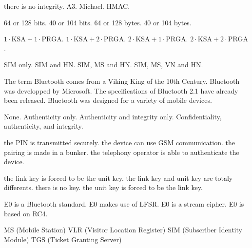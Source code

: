 {there is no integrity.}
{A3.}
{Michael.}
{HMAC.}

{64 or 128 bits.}
{40 or 104 bits.}
{64 or 128 bytes.}
{40 or 104 bytes.}

{$1\cdot\mathrm{KSA} + 1\cdot\mathrm{PRGA}$.}
{$1\cdot\mathrm{KSA}+ 2\cdot\mathrm{PRGA}$.}
{$2\cdot\mathrm{KSA}+ 1\cdot\mathrm{PRGA}$.}
{$2\cdot\mathrm{KSA}+ 2\cdot\mathrm{PRGA}$.}

%
{SIM only.}%
{SIM and HN.}%
{SIM, MS and HN.}%
{SIM, MS, VN and HN.}%

{The term Bluetooth comes from a Viking King of the 10th Century.}
{Bluetooth was developped by Microsoft.}
{The specifications of Bluetooth 2.1 have already been released.}
{Bluetooth was designed for a variety of mobile devices.}

%
{None.}%
{Authenticity only.}%
{Authenticity and integrity only.}%
{Confidentiality, authenticity, and integrity.}%

%
{the PIN is transmitted securely.}%
{the device can use GSM communication.}%
{the pairing is made in a bunker.}%
{the telephony operator is able to authenticate the device.}%

%
{the link key is forced to be the unit key.}%
{the link key and unit key are totaly differents.}%
{there is no key.}%
{the unit key is forced to be the link key.}%

{E0 is a Bluetooth standard.}
{E0 makes use of LFSR.}
{E0 is a stream cipher.}
{E0 is based on RC4.}

{MS (Mobile Station)}
{VLR (Visitor Location Register)}
{SIM (Subscriber Identity Module)}
{TGS (Ticket Granting Server)}

